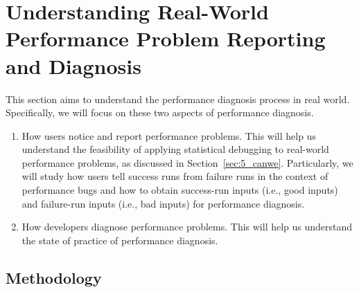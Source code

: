 \section{Understanding Real-World Performance Problem Reporting and Diagnosis}
\label{sec:5_study}

This section aims to understand the performance diagnosis process
in real world. Specifically, we will focus on these two aspects of
performance diagnosis.

\begin{enumerate}
\item How users notice and report performance problems.
This will help us understand the feasibility of applying statistical debugging
to real-world performance problems, as discussed in 
Section~\ref{sec:5_canwe}. Particularly, we will study how users
tell success runs from failure
runs in the context of performance bugs and how to obtain
success-run inputs (i.e., good inputs) and failure-run inputs
(i.e., bad inputs) for performance diagnosis.
\item How developers diagnose performance problems.
This will help us understand the state of practice of performance diagnosis.
\end{enumerate}

\subsection{Methodology}



